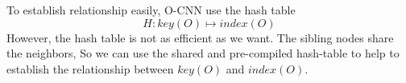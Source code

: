 \documentclass[border=0.5in]{blog}
\begin{document}
    To establish relationship easily, O-CNN use the hash table 
    $$
        H:key(O) \mapsto index(O)
    $$ 
    However, the hash table is not as efficient as we want. The sibling nodes share the neighbors,
    So we can use the shared and pre-compiled hash-table to help to establish the relationship
    between $key(O)$ and $index(O)$.

    

        
\end{document}
